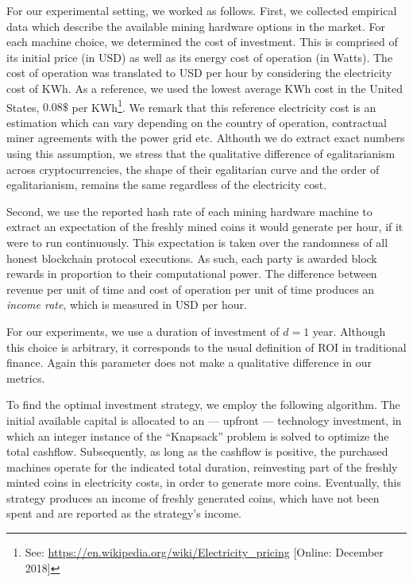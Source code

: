 For our experimental setting, we worked as follows. First, we collected
empirical data which describe the available mining hardware options in the
market. For each machine choice, we determined the cost of investment. This is
comprised of its initial price (in USD) as well as its energy cost of operation
(in Watts). The cost of operation was translated to USD per hour by considering
the electricity cost of KWh. As a reference, we used the lowest average KWh
cost in the United States, \ie $0.08\$$ per KWh\footnote{See:
\url{https://en.wikipedia.org/wiki/Electricity_pricing} [Online: December
2018]}. We remark that this reference electricity cost is an estimation which
can vary depending on the country of operation, contractual miner agreements
with the power grid etc. Althouth we do extract exact numbers using this
assumption, we stress that the qualitative difference of egalitarianism across
cryptocurrencies, \ie the shape of their egalitarian curve and the order of
egalitarianism, remains the same regardless of the electricity cost.

Second, we use the reported hash rate of each mining hardware machine to
extract an expectation of the freshly mined coins it would generate per hour,
if it were to run continuously. This expectation is taken over the randomness
of all honest blockchain protocol executions. As such, each party is awarded
block rewards in proportion to their computational power. The difference
between revenue per unit of time and cost of operation per unit of time
produces an \emph{income rate}, which is measured in USD per hour.

For our experiments, we use a duration of investment of $d = 1$ year. Although
this choice is arbitrary, it corresponds to the usual definition of ROI in
traditional finance. Again this parameter does not make a qualitative
difference in our metrics.

To find the optimal investment strategy, we employ the following algorithm. The
initial available capital is allocated to an --- upfront --- technology
investment, in which an integer instance of the ``Knapsack'' problem
\cite{mathews1896partition} is solved to optimize the total cashflow.
Subsequently, as long as the cashflow is positive, the purchased machines
operate for the indicated total duration, reinvesting part of the freshly
minted coins in electricity costs, in order to generate more coins. Eventually,
this strategy produces an income of freshly generated coins, which have not
been spent and are reported as the strategy's income.

